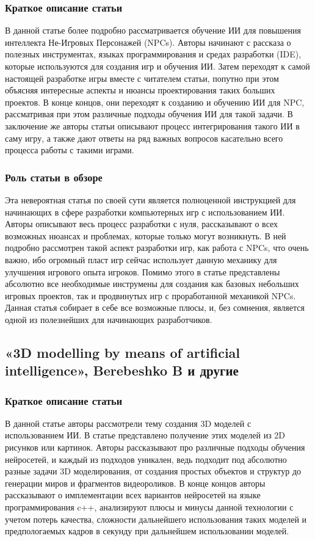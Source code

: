 \documentclass[14pt]{article}
\begin{document}
\subsubsection{Краткое описание статьи}
В данной статье более подробно рассматривается обучение ИИ для повышения интеллекта Не-Игровых Персонажей (NPCs). Авторы начинают с рассказа о полезных инструментах, языках программирования и средах разработки (IDE), которые используются для создания игр и обучения ИИ. Затем переходят к самой настоящей разработке игры вместе с читателем статьи, попутно при этом объясняя интересные аспекты и нюансы проектирования таких больших проектов. В конце концов, они переходят к созданию и обучению ИИ для NPC, рассматривая при этом различные подходы обучения ИИ для такой задачи. В заключение же авторы статьи описывают процесс интегрирования такого ИИ в саму игру, а также дают ответы на ряд важных вопросов касательно всего процесса работы с такими играми. 

\subsubsection{Роль статьи в обзоре}
Эта невероятная статья по своей сути является полноценной инструкцией для начинающих в сфере разработки компьютерных игр с использованием ИИ. Авторы описывают весь процесс разработки с нуля, рассказывают о всех возможных нюансах и проблемах, которые только могут возникнуть. В ней подробно рассмотрен такой аспект разработки игр, как работа с NPCs, что очень важно, ибо огромный пласт игр сейчас использует данную механику для улучшения игрового опыта игроков. Помимо этого в статье представлены абсолютно все необходимые инструмены для создания как базовых небольших игровых проектов, так и продвинутых игр с проработанной механикой NPCs. Данная статья собирает в себе все возможные плюсы, и, без сомнения, является одной из полезнейших для начинающих разработчиков. 

\subsection{«3D modelling by means of artificial
intelligence», Berebeshko B и другие}
\subsubsection{Краткое описание статьи}
В данной статье авторы рассмотрели тему создания 3D моделей с использованием ИИ. В статье представлено получение этих моделей из 2D рисунков или картинок. Авторы рассказывают про различные подходы обучения нейросетей, и каждый из подходов уникален, ведь подходит под абсолютно разные задачи 3D моделирования, от создания простых объектов и структур до генерации миров и фрагментов видеороликов. В конце концов авторы рассказывают о имплементации всех вариантов нейросетей на языке программирования c++, анализируют плюсы и минусы данной технологии с учетом потерь качества, сложности дальнейшего использования таких моделей и предпологаемых кадров в секунду при дальнейшем использовании моделей.
\end{document}
